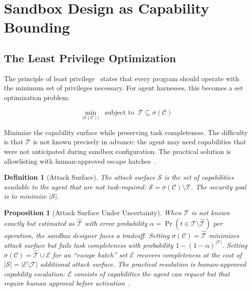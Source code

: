 \documentclass[11pt, a4paper, copyright]{googledeepmind}
\newtheorem{definition}{Definition}[section]
\newtheorem{proposition}{Proposition}[section]
\begin{document}
\section{Sandbox Design as Capability Bounding}
\label{sec:capability}

\subsection{The Least Privilege Optimization}

The principle of least privilege~\citep{saltzer1975protection} states that every program should operate with the minimum set of privileges necessary. For agent harnesses, this becomes a set optimization problem:

\begin{equation}
\label{eq:leastpriv}
\min_{|\sigma(\mathcal{C})|} \;\; \text{subject to} \;\; \mathcal{T} \subseteq \sigma(\mathcal{C})
\end{equation}

Minimize the capability surface while preserving task completeness. The difficulty is that $\mathcal{T}$ is not known precisely in advance: the agent may need capabilities that were not anticipated during sandbox configuration. The practical solution is allowlisting with human-approved escape hatches~\citep{pillar-human-interaction}.

\begin{definition}[Attack Surface]
\label{def:attack-surface}
The \emph{attack surface} $\mathcal{S}$ is the set of capabilities available to the agent that are not task-required: $\mathcal{S} = \sigma(\mathcal{C}) \setminus \mathcal{T}$. The security goal is to minimize $|\mathcal{S}|$.
\end{definition}

\begin{proposition}[Attack Surface Under Uncertainty]
\label{prop:attack-surface}
When $\mathcal{T}$ is not known exactly but estimated as $\hat{\mathcal{T}}$ with error probability $\alpha = \Pr(t \in \mathcal{T} \setminus \hat{\mathcal{T}})$ per operation, the sandbox designer faces a tradeoff. Setting $\sigma(\mathcal{C}) = \hat{\mathcal{T}}$ minimizes attack surface but fails task completeness with probability $1 - (1-\alpha)^{|\mathcal{T}|}$. Setting $\sigma(\mathcal{C}) = \hat{\mathcal{T}} \cup \mathcal{E}$ for an ``escape hatch'' set $\mathcal{E}$ recovers completeness at the cost of $|\mathcal{S}| = |\mathcal{E} \setminus \mathcal{T}|$ additional attack surface. The practical resolution is human-approved capability escalation: $\mathcal{E}$ consists of capabilities the agent can request but that require human approval before activation~\citep{pillar-human-interaction}.
\end{proposition}
\end{document}
